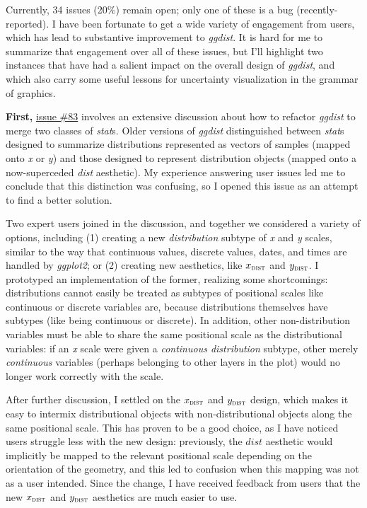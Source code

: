 \documentclass[journal]{vgtc}              %
\begin{document}
Currently, 34 issues (20\%) remain open; only one of these is a bug (recently-reported). 
I have been fortunate to get a wide variety of engagement from users, which has lead to substantive improvement to \textit{ggdist}. It is hard for me to summarize that engagement over all of these issues, but I'll highlight two instances that have had a salient impact on the overall design of \textit{ggdist}, and which also carry some useful lessons for uncertainty visualization in the grammar of graphics.

\textbf{First,} \href{https://github.com/mjskay/ggdist/issues/83}{issue \#83} involves an extensive discussion about how to refactor \textit{ggdist} to merge two classes of \textit{stat}s. Older versions of \textit{ggdist} distinguished between \textit{stat}s designed to summarize distributions represented as vectors of samples (mapped onto \textit{x} or \textit{y}) and those designed to represent distribution objects (mapped onto a now-superceded \textit{dist} aesthetic). My experience answering user issues led me to conclude that this distinction was confusing, so I opened this issue as an attempt to find a better solution. 

Two expert users joined in the discussion, and together we considered a variety of options, including (1) creating a new \textit{distribution} subtype of \textit{x} and \textit{y} scales, similar to the way that continuous values, discrete values, dates, and times are handled by \textit{ggplot2}; or (2) creating new aesthetics, like $x_\textsc{dist}$ and $y_\textsc{dist}$. I prototyped an implementation of the former, realizing some shortcomings: distributions cannot easily be treated as subtypes of positional scales like continuous or discrete variables are, because distributions themselves have subtypes (like being continuous or discrete). In addition, other non-distribution variables must be able to share the same positional scale as the distributional variables: if an \textit{x} scale were given a \textit{continuous distribution} subtype, other merely \textit{continuous} variables (perhaps belonging to other layers in the plot) would no longer work correctly with the scale.

After further discussion, I settled on the $x_\textsc{dist}$ and $y_\textsc{dist}$ design, which makes it easy to intermix distributional objects with non-distributional objects along the same positional scale. This has proven to be a good choice, as I have noticed users struggle less with the new design: previously, the $\textit{dist}$ aesthetic would implicitly be mapped to the relevant positional scale depending on the orientation of the geometry, and this led to confusion when this mapping was not as a user intended. Since the change, I have received feedback from users that the new $x_\textsc{dist}$ and $y_\textsc{dist}$ aesthetics are much easier to use.
\end{document}
